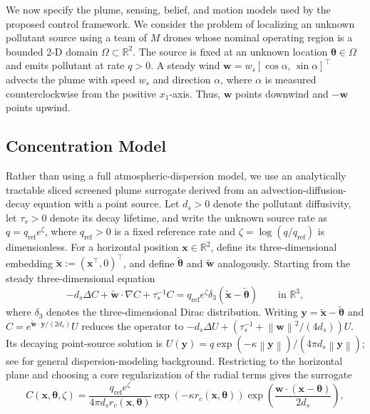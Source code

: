 \documentclass{article}
\newcommand{\R}{\mathbb{R}}
\newcommand{\norm}[1]{\left\|#1\right\|}
\newcommand{\bs}[1]{\boldsymbol{#1}}
\newcommand{\x}{\mathbf{x}}
\begin{document}
We now specify the plume, sensing, belief, and motion models used by the proposed control framework.
We consider the problem of localizing an unknown pollutant source using a team of $M$ drones whose nominal operating region is a bounded 2-D domain $\Omega\subset\R^2$.
The source is fixed at an unknown location $\bs\theta\in\Omega$ and emits pollutant at rate $q>0$.
A steady wind $\bs w = w_s[\cos\alpha,\,\sin\alpha]^\top$ advects the plume with speed $w_s$ and direction $\alpha$, where $\alpha$ is measured counterclockwise from the positive $x_1$-axis.
Thus, $\bs w$ points downwind and $-\bs w$ points upwind.

\subsection{Concentration Model}
\label{sec:plume_model}
Rather than using a full atmospheric-dispersion model, we use an analytically tractable sliced screened plume surrogate derived from an advection-diffusion-decay equation with a point source.
Let $d_s>0$ denote the pollutant diffusivity, let $\tau_s>0$ denote its decay lifetime, and write the unknown source rate as
$q=q_{\mathrm{ref}}e^\zeta$, where $q_{\mathrm{ref}}>0$ is a fixed reference rate and $\zeta=\log(q/q_{\mathrm{ref}})$ is dimensionless.
For a horizontal position $\x\in\R^2$, define its three-dimensional embedding $\widetilde{\x}:=(\x^\top,0)^\top$, and define $\widetilde{\bs\theta}$ and $\widetilde{\bs w}$ analogously.
Starting from the steady three-dimensional equation
\begin{equation}
-d_s \Delta C + \widetilde{\bs w}\cdot \nabla C + \tau_s^{-1} C
= q_{\mathrm{ref}}e^\zeta \delta_3(\widetilde{\x}-\widetilde{\bs\theta})
\qquad \text{in } \R^3,
\end{equation}
where $\delta_3$ denotes the three-dimensional Dirac distribution.
Writing $\bs y=\widetilde{\x}-\widetilde{\bs\theta}$ and $C=e^{\widetilde{\bs w}\cdot\bs y/(2d_s)}U$ reduces the operator to $-d_s\Delta U+(\tau_s^{-1}+\norm{\bs w}^2/(4d_s))U$.
Its decaying point-source solution is $U(\bs y)=q\exp(-\kappa\norm{\bs y})/(4\pi d_s\norm{\bs y})$; see \cite{Stockie2011} for general dispersion-modeling background.
Restricting to the horizontal plane and choosing a core regularization of the radial terms gives the surrogate
\begin{equation}
\label{eq:plume_model}
C(\x,\bs\theta,\zeta)=
\frac{q_{\mathrm{ref}}e^{\zeta}}{4\pi d_s r_c(\x,\bs\theta)}
\exp\!\left(-\kappa r_c(\x,\bs\theta)\right)
\exp\!\left(\frac{\bs w\cdot(\x-\bs\theta)}{2d_s}\right),
\end{equation}
\end{document}
